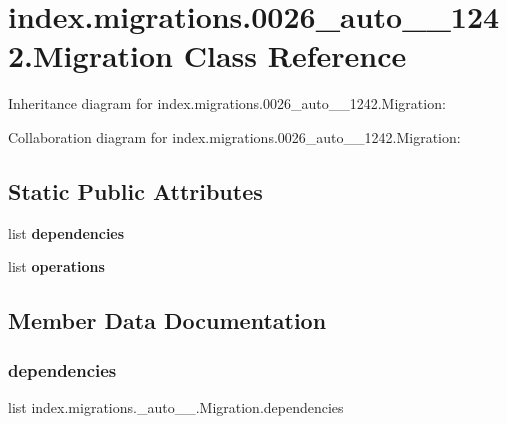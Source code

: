 \hypertarget{classindex_1_1migrations_1_10026__auto__20171028__1242_1_1Migration}{}\section{index.\+migrations.0026\+\_\+auto\+\_\+\_\+1242.Migration Class Reference}
\label{classindex_1_1migrations_1_10026__auto__20171028__1242_1_1Migration}


Inheritance diagram for index.\+migrations.0026\+\_\+auto\+\_\+\_\+1242.Migration\+:


Collaboration diagram for index.\+migrations.0026\+\_\+auto\+\_\+\_\+1242.Migration\+:
\subsection*{Static Public Attributes}
\begin{DoxyCompactItemize}
\item 
list {\bfseries dependencies}
\item 
list {\bfseries operations}
\end{DoxyCompactItemize}


\subsection{Member Data Documentation}
\mbox{\label{classindex_1_1migrations_1_10026__auto__20171028__1242_1_1Migration_abc9606e5c29adccfbc6fe32a423ec201}} 
\subsubsection{\texorpdfstring{dependencies}{dependencies}}
{\footnotesize\ttfamily list index.\+migrations.\+\_\+auto\+\_\+\_.\+Migration.\+dependencies\hspace{0.3cm}{\ttfamily [static]}}

